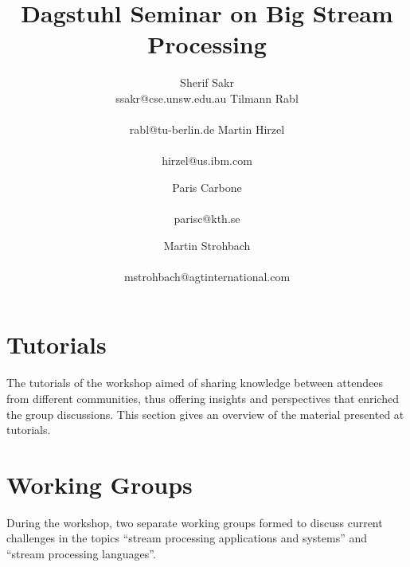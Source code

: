 \documentclass[preprint]{sig-alternate-10pt}
\begin{document}
\title{Dagstuhl Seminar on Big Stream Processing}

\newcommand*{\emailn}[1]{\textsf{\normalsize #1}}

\author{
\alignauthor
Sherif Sakr\\
  \emailn{ssakr@cse.unsw.edu.au}
\alignauthor
Tilmann Rabl\\
  \\
  \emailn{rabl@tu-berlin.de}
\alignauthor
Martin Hirzel\\
  \\
  \emailn{hirzel@us.ibm.com}
\and
\alignauthor
Paris Carbone\\
  \\
  \emailn{parisc@kth.se}
\and
\alignauthor
Martin Strohbach\\
  \\
  \emailn{mstrohbach@agtinternational.com}}


\maketitle



\section{Tutorials}
The tutorials of the workshop aimed of sharing knowledge between
attendees from different communities, thus offering insights and
perspectives that enriched the group discussions. This section gives
an overview of the material presented at tutorials.




\section{Working Groups}
During the workshop, two separate working groups formed to discuss
current challenges in the topics ``stream processing applications and systems''
and ``stream processing languages''.






\balance

\end{document}
